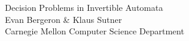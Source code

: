 \documentclass[a0]{a0poster}
\newcommand*{\concourse}{}
\theoremstyle{pleasant}
\newcommand{\0}{\underline{0}}
\newcommand{\1}{\underline{1}}
\newcommand{\2}{\underline{2}}
\begin{document}


\begin{minipage}[b]{0.55\linewidth}
  \veryHuge \color{NavyBlue} \concourse{Decision Problems in
    Invertible Automata} \color{Black}\\ %
\huge \concourse{Evan Bergeron \& Klaus Sutner}\\ %
\huge Carnegie Mellon Computer Science Department\\ %
\end{minipage}



\end{document}
